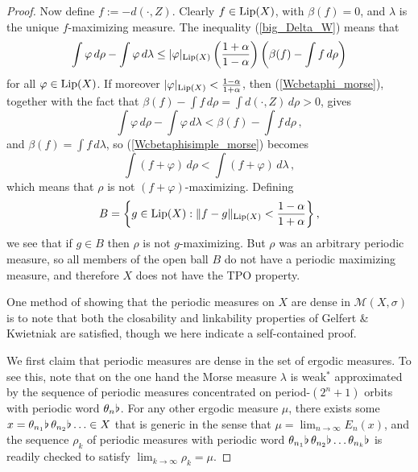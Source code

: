 \documentclass[reqno,11pt]{amsart}
\theoremstyle{definition}
\theoremstyle{remark}
\theoremstyle{remark}
\def\a{\alpha}
\def\m{\mathcal M}
\def\lip{{\rm Lip}}
\def\b{\kern 0.02em \flat \kern 0.02em}
\numberwithin{equation}{section}
\begin{document}
\begin{proof}
Now define $f:=-d(\cdot,Z)$. Clearly $f\in\lip(X)$, with $\beta(f)=0$, and $\lambda$ is the unique $f$-maximizing measure.
The inequality (\ref{big_Delta_W}) means that
\begin{equation}\label{Wcbetaphi_morse}
\int \varphi\, d\rho - \int \varphi\, d\lambda \le |\varphi|_{\lip(X)}
\left(\frac{1+\a}{1-\a}\right)
\left(\beta(f) -\int f\, d\rho \right)
\end{equation}
for all $\varphi\in\lip(X)$.
If moreover $|\varphi|_{\lip(X)}< \frac{1-\a}{1+\a}$, then (\ref{Wcbetaphi_morse}),
together with the fact that $\beta(f)-\int f\, d\rho = \int d(\cdot,Z)\, d\rho>0$,
 gives
\begin{equation}\label{Wcbetaphisimple_morse}
\int \varphi\, d\rho - \int \varphi\, d\lambda < \beta(f) -\int f\, d\rho \,,
\end{equation}
and $\beta(f)=\int f\, d\lambda$, so
(\ref{Wcbetaphisimple_morse}) becomes
\begin{equation}\label{Wcbetaphisimpler_morse}
\int (f+\varphi)\, d\rho < \int (f+ \varphi)\, d\lambda  \,,
\end{equation}
which means that $\rho$ is not $(f+\varphi)$-maximizing.
Defining $$B=\left\{g\in\lip(X):\|f-g\|_{\lip(X)}< \frac{1-\a}{1+\a} \right\},$$
we see that if $g\in B$ then 
$\rho$ is not $g$-maximizing.
But $\rho$ was an arbitrary periodic measure, so all members of the open ball $B$ do not have a periodic maximizing measure, and therefore $X$ does not have the TPO property.

One method of showing that the periodic measures on $X$ are dense in $\m(X,\sigma)$ is to note that both the closability and linkability properties of Gelfert \& Kwietniak \cite{GK18} are satisfied, though we here indicate a self-contained proof.

We first claim that periodic measures are dense in the set of ergodic measures. To see this, note that on the one hand the Morse measure
$\lambda$ is weak$^*$ approximated by the sequence of periodic measures concentrated on period-$(2^n+1)$ orbits
with periodic word $\theta_n\b$. For any other ergodic measure $\mu$, there exists some $x=\theta_{n_1}\b\, \theta_{n_2}\b\ldots \in X$ that is generic in the sense that $\mu=\lim_{n\to\infty} E_n(x)$, and the sequence $\rho_k$ of periodic
measures with periodic word
$\theta_{n_1}\b\, \theta_{n_2}\b\ldots \theta_{n_k}\b$ is readily checked to satisfy $\lim_{k\to\infty}\rho_k = \mu$.


\end{proof}
\end{document}
